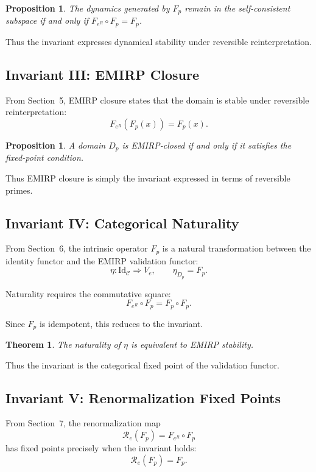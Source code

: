 \documentclass[11pt]{article}
\theoremstyle{definition}
\theoremstyle{plain}
\newtheorem{theorem}[definition]{Theorem}
\newtheorem{proposition}[definition]{Proposition}
\theoremstyle{remark}
\begin{document}
\begin{proposition}
The dynamics generated by $F_p$ remain in the self-consistent subspace
if and only if $F_{e^R} \circ F_p = F_p$.
\end{proposition}

Thus the invariant expresses dynamical stability under reversible
reinterpretation.

\subsection{Invariant III: EMIRP Closure}

From Section~5, EMIRP closure states that the domain is stable under
reversible reinterpretation:
\[
F_{e^R}(F_p(x)) = F_p(x).
\]

\begin{proposition}
A domain $D_p$ is EMIRP-closed if and only if it satisfies the
fixed-point condition.
\end{proposition}

Thus EMIRP closure is simply the invariant expressed in terms of
reversible primes.

\subsection{Invariant IV: Categorical Naturality}

From Section~6, the intrinsic operator $F_p$ is a natural transformation
between the identity functor and the EMIRP validation functor:
\[
\eta : \mathrm{Id}_{\mathcal{C}} \Rightarrow V_e,
\qquad
\eta_{D_p} = F_p.
\]

Naturality requires the commutative square:
\[
F_{e^R} \circ F_p = F_p \circ F_p.
\]

Since $F_p$ is idempotent, this reduces to the invariant.

\begin{theorem}
The naturality of $\eta$ is equivalent to EMIRP stability.
\end{theorem}

Thus the invariant is the categorical fixed point of the validation
functor.

\subsection{Invariant V: Renormalization Fixed Points}

From Section~7, the renormalization map
\[
\mathcal{R}_e(F_p) = F_{e^R} \circ F_p
\]
has fixed points precisely when the invariant holds:
\[
\mathcal{R}_e(F_p) = F_p.
\]
\end{document}
